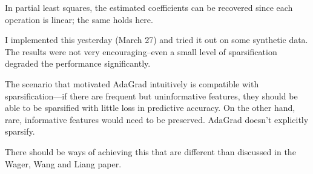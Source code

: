 \documentclass[12pt]{imsart}
\numberwithin{equation}{section}
\theoremstyle{plain}
\theoremstyle{remark}
\begin{document}
In partial least squares, the estimated coefficients
can be recovered since each operation is linear; the same
holds here.

I implemented this yesterday (March 27) and tried it out on some synthetic data.
The results were not very encouraging--even a small level
of sparsification degraded the performance significantly.

The scenario that motivated AdaGrad intuitively is compatible
with sparsification---if there are frequent but uninformative
features, they should be able to be sparsified with little
loss in predictive accuracy.  On the other hand, rare,
informative features would need to be preserved.  AdaGrad
doesn't explicitly sparsify.

There should be ways of achieving this that are different
than discussed in the Wager, Wang and Liang paper.
\end{document}
